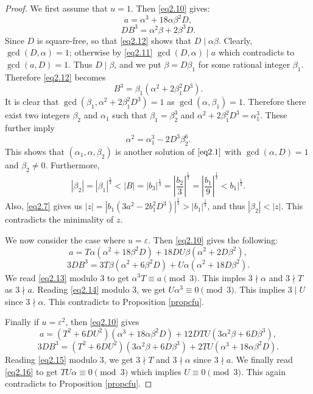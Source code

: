 \documentclass[10pt,a4paper]{amsart}
\begin{document}
\begin{proof}
We first assume that $u=1$. Then \eqref{eq2.10} gives:
\begin{equation}\label{eq2.11}
a=\alpha^3+18\alpha\beta^2D,
\end{equation} 
\begin{equation}\label{eq2.12}
DB^3=\alpha^2\beta+2\beta^3 D.
\end{equation}
Since $D$ is square-free, so that \eqref{eq2.12} shows that $D\mid \alpha\beta$. Clearly, $\gcd(D,\alpha)=1$; otherwise by \eqref{eq2.11} $\gcd(D,\alpha)\mid a$ which contradicts to $\gcd(a,D)=1$. Thus $D\mid \beta$, and we put $\beta=D\beta_1$ for some rational integer $\beta_1$. Therefore \eqref{eq2.12} becomes 
$$B^3=\beta_1(\alpha^2+2\beta_1^2D^3).$$
It is clear that $\gcd(\beta_1, \alpha^2+2\beta_1^2D^3)=1$ as $\gcd(\alpha, \beta_1)=1$. Therefore there exist two integers $\beta_2$ and $\alpha_1$ such that $\beta_1=\beta_2^3$ and $\alpha^2+2\beta_1^2D^3=\alpha_1^3$. These further imply 
$$\alpha^2=\alpha_1^3-2D^3\beta_2^6.$$
This shows that $(\alpha_1, \alpha, \beta_2)$ is another solution of $\eqref{eq2.1}$ with $\gcd(\alpha,D)=1$ and $\beta_2\ne 0$. Furthermore, 
$$|\beta_2|=|\beta_1|^{\frac{1}{3}}<|B|=|b_3|^{\frac{1}{3}}=|\frac{b_2}{3}|^{\frac{1}{3}}=|\frac{b_1}{9}|^{\frac{1}{3}}<b_1|^{\frac{1}{3}}.$$
Also, \eqref{eq2.7} gives us  
$|z|=|b_1(3a^2-2b_1^2D^3)|^{\frac{1}{3}}>|b_1|^{\frac{1}{3}}$, and thus $|\beta_2|<|z|$. This contradicts the minimality of $z$. 

We now consider the case where $u=\varepsilon$. Then \eqref{eq2.10} gives the following:
\begin{equation}\label{eq2.13}
a=T\alpha(\alpha^2+18\beta^2D)+18DU\beta(\alpha^2+2D\beta^2),
\end{equation} 
\begin{equation}\label{eq2.14}
3DB^3=3T\beta(\alpha^2+6\beta^2D)+U\alpha(\alpha^2+18D\beta^2).
\end{equation}
We read \eqref{eq2.13} modulo $3$ to get $\alpha^3T\equiv a\pmod 3$. This imples $3\nmid\alpha$  and $3\nmid T$ as $3\nmid a$. Reading \eqref{eq2.14} modulo $3$, we get 
$U\alpha^3\equiv 0\pmod 3$. This implies $3\mid U$ since $3\nmid \alpha$. This contradicts to Proposition \ref{propcfu}.

Finally if $u=\varepsilon^2$, then \eqref{eq2.10} gives 
\begin{equation}\label{eq2.15}
a=(T^2+6DU^2)(\alpha^3+18\alpha\beta^2D)+12DTU(3\alpha^2\beta+6D\beta^3),
\end{equation}
\begin{equation}\label{eq2.16}
3DB^3=(T^2+6DU^2)(3\alpha^2\beta+6D\beta^3)+2TU(\alpha^3+18\alpha\beta^2D).
\end{equation}
Reading \eqref{eq2.15} modulo $3$, we get $3\nmid T$ and $3\nmid \alpha$ since $3\nmid a$. We finally read \eqref{eq2.16} to get $TU\alpha\equiv 0\pmod 3$ which implies $U\equiv 0\pmod 3$. This again contradicts to Proposition \ref{propcfu}. 
\end{proof}
\end{document}
